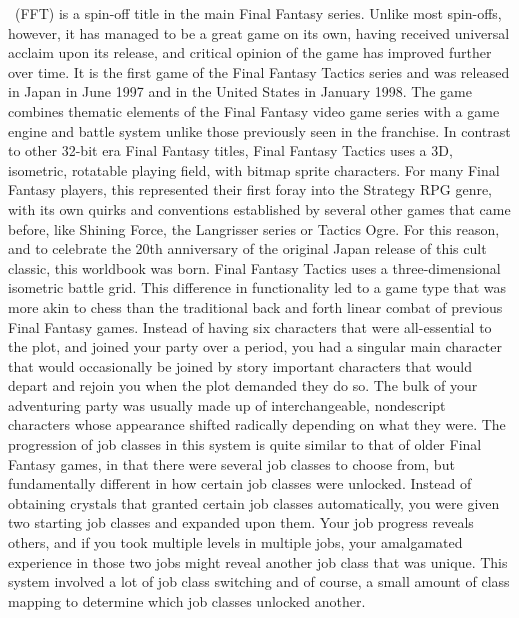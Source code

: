 %
\ofpar
%
~(FFT) is a spin-off title in the main Final Fantasy series. 
Unlike most spin-offs, however, it has managed to be a great game on its own, having received universal acclaim upon its release, and critical opinion of the game has improved further over time. 
It is the first game of the Final Fantasy Tactics series and was released in Japan in June 1997 and in the United States in January 1998. 
The game combines thematic elements of the Final Fantasy video game series with a game engine and battle system unlike those previously seen in the franchise. 
In contrast to other 32-bit era Final Fantasy titles, Final Fantasy Tactics uses a 3D, isometric, rotatable playing field, with bitmap sprite characters.
For many Final Fantasy players, this represented their first foray into the Strategy RPG genre, with its own quirks and conventions established by several other games that came before, like Shining Force, the Langrisser series or Tactics Ogre. 
For this reason, and to celebrate the 20th anniversary of the original Japan release of this cult classic, this worldbook was born.
%
\vfill
%
Final Fantasy Tactics uses a three-dimensional isometric battle grid. 
This difference in functionality led to a game type that was more akin to chess than the traditional back and forth linear combat of previous Final Fantasy games. 
Instead of having six characters that were all-essential to the plot, and joined your party over a period, you had a singular main character that would occasionally be joined by story important characters that would depart and rejoin you when the plot demanded they do so. 
The bulk of your adventuring party was usually made up of interchangeable, nondescript characters whose appearance shifted radically depending on what  they were.
The progression of job classes in this system is quite similar to that of older Final Fantasy games, in that there were several job classes to choose from, but fundamentally different in how certain
job classes were unlocked. 
Instead of obtaining crystals that granted certain job classes automatically, you were given two starting job classes and expanded upon them. 
Your job progress reveals others, and if you took multiple levels in multiple jobs, your amalgamated experience in those two jobs might reveal another job class that was unique. 
This system involved a lot of job class switching and of course, a small amount of class mapping to determine which job classes unlocked another.
%
\vfill
%
\\\\

